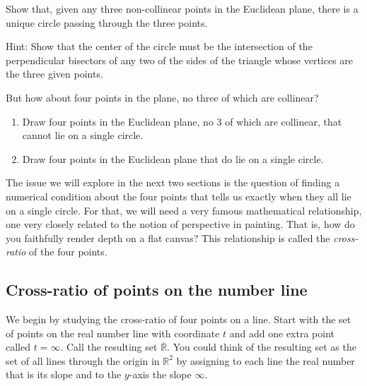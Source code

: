 \documentclass{ximera}
\begin{document}
\begin{exercise}
Show that, given any three non-collinear points in the Euclidean
plane, there is a unique circle passing through the three points.

Hint: Show that the center of the circle must be the intersection of
the perpendicular bisectors of any two of the sides of the triangle
whose vertices are the three given points.
\end{exercise}

But how about four points in the plane, no three of which are
collinear?

\begin{exercise}
\begin{enumerate}
\item Draw four points in the Euclidean plane, no $3$ of which are collinear, that cannot lie on a single circle.
\item Draw four points in the Euclidean plane that do lie on a single
circle.
\end{enumerate}
\end{exercise}

The issue we will explore in the next two sections is the question of
finding a numerical condition about the four points that tells us
exactly when they all lie on a single circle. For that, we will need a
very famous mathematical relationship, one very closely related to the
notion of perspective in painting. That is, how do you faithfully
render depth on a flat canvas? This relationship is called
the \textit{cross-ratio} of the four points.

\subsection*{Cross-ratio of points on the number line}

We begin by studying the cross-ratio of four points on a line. Start
with the set of points on the real number line with coordinate $t$ and
add one extra point called $t=\infty$. Call the resulting set
$\overline{\mathbb{R}}$. You could think of the resulting set as the
set of all lines through the origin in $\mathbb{R}^{2}$ by assigning
to each line the real number that is its slope and to the $y$-axis the
slope $\infty$.
\end{document}
